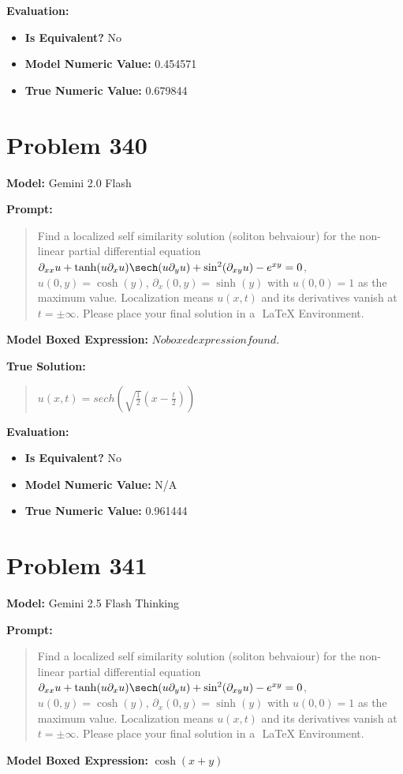 \documentclass{article}
\begin{document}
{\textbf{Evaluation:}
\begin{itemize}
\item \textbf{Is Equivalent?} No
\item \textbf{Model Numeric Value:} 0.454571
\item \textbf{True Numeric Value:} 0.679844
\end{itemize}
\vspace{1cm}
\section*{Problem 340}
\textbf{Model:} Gemini 2.0 Flash

\textbf{Prompt:}
\begin{quote}
Find a localized self similarity solution (soliton behvaiour) for the non-linear partial differential equation $\partial_{xx} u + \tanh(u \partial_x u) \sech(u \partial_y u) + \sin^2(\partial_{xy} u) - e^{xy} = 0$, $u(0, y) = \cosh(y)$, $\partial_x(0, y) = \sinh(y)$ with $u(0, 0) = 1$ as the maximum value. Localization means $u(x,t)$ and its derivatives vanish at $t= \pm \infty$. Please place your final solution in a $\boxed{}$ LaTeX Environment.
\end{quote}
\textbf{Model Boxed Expression:} $No boxed expression found.$

\textbf{True Solution:}
\begin{quote}
$u(x, t) = sech(\sqrt{\frac{1}{2}} (x-\frac{t}{2}))$
\end{quote}

\textbf{Evaluation:}
\begin{itemize}
\item \textbf{Is Equivalent?} No
\item \textbf{Model Numeric Value:} N/A
\item \textbf{True Numeric Value:} 0.961444
\end{itemize}
\vspace{1cm}
\section*{Problem 341}
\textbf{Model:} Gemini 2.5 Flash Thinking

\textbf{Prompt:}
\begin{quote}
Find a localized self similarity solution (soliton behvaiour) for the non-linear partial differential equation $\partial_{xx} u + \tanh(u \partial_x u) \sech(u \partial_y u) + \sin^2(\partial_{xy} u) - e^{xy} = 0$, $u(0, y) = \cosh(y)$, $\partial_x(0, y) = \sinh(y)$ with $u(0, 0) = 1$ as the maximum value. Localization means $u(x,t)$ and its derivatives vanish at $t= \pm \infty$. Please place your final solution in a $\boxed{}$ LaTeX Environment.
\end{quote}
\textbf{Model Boxed Expression:} $\cosh(x+y)$

}
\end{document}
